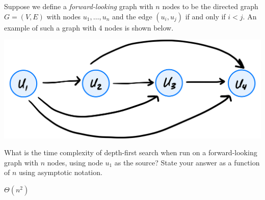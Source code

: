 \begin{prob}

    Suppose we define a \textit{forward-looking} graph with $n$ nodes to be the
    directed graph $G = (V, E)$ with nodes $u_1, \ldots, u_n$ and the edge
    $(u_i, u_j)$ if and only if $i < j$. An example of such a graph with 4
    nodes is shown below.

    \includegraphics{./graph.png}

    What is the time complexity of depth-first search when run on a
    forward-looking graph with $n$ nodes, using node $u_1$ as the source? State
    your answer as a function of $n$ using asymptotic notation.

    \begin{soln}
        $\Theta(n^2)$
    \end{soln}

\end{prob}
